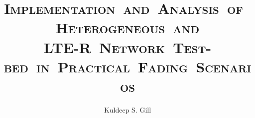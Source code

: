 \documentclass[11pt]{mvlthesis}
\title{\scshape \mbox{Implementation and Analysis of Heterogeneous and}\\
\scshape \mbox{LTE-R Network Test-bed in Practical Fading Scenarios}}
\author{Kuldeep S. Gill}
\begin{document}
\maketitle
\begin{abstract}



\end{abstract}

\begin{acknowledgements}



\end{acknowledgements}

\begin{frontmatter}
\tableofcontents
\listoffigures
\listoftables
\end{frontmatter}



%

















\appendix
{}


\end{document}
